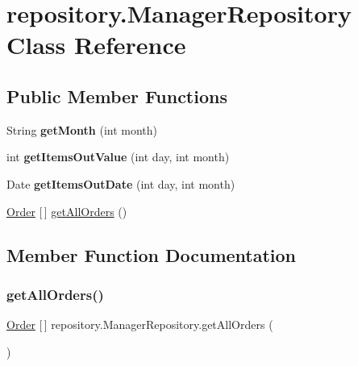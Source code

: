 \hypertarget{classrepository_1_1_manager_repository}{}\section{repository.\+Manager\+Repository Class Reference}
\label{classrepository_1_1_manager_repository}
\subsection*{Public Member Functions}
\begin{DoxyCompactItemize}
\item 
\mbox{\label{classrepository_1_1_manager_repository_ae52c653f3008bfa5bc0f5af8dab9db43}} 
String {\bfseries get\+Month} (int month)
\item 
\mbox{\label{classrepository_1_1_manager_repository_a0e915572c7802a1e4503c558cabab270}} 
int {\bfseries get\+Items\+Out\+Value} (int day, int month)
\item 
\mbox{\label{classrepository_1_1_manager_repository_a674b19911835ed9b14bc4e8ad6bbad95}} 
Date {\bfseries get\+Items\+Out\+Date} (int day, int month)
\item 
\mbox{\hyperlink{classentity_1_1_order}{Order}} \mbox{[}$\,$\mbox{]} \mbox{\hyperlink{classrepository_1_1_manager_repository_aa79e0ef0402a40bb0cc00694ca02adf2}{get\+All\+Orders}} ()
\end{DoxyCompactItemize}


\subsection{Member Function Documentation}
\mbox{\label{classrepository_1_1_manager_repository_aa79e0ef0402a40bb0cc00694ca02adf2}} 
\subsubsection{\texorpdfstring{get\+All\+Orders()}{getAllOrders()}}
{\footnotesize\ttfamily \mbox{\hyperlink{classentity_1_1_order}{Order}} \mbox{[}$\,$\mbox{]} repository.\+Manager\+Repository.\+get\+All\+Orders (\begin{DoxyParamCaption}{ }\end{DoxyParamCaption})\hspace{0.3cm}{\ttfamily [inline]}}


